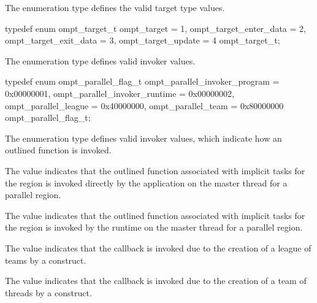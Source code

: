 \label{sec:ompt_target_t}

\summary
The  enumeration type defines the valid target type values.

\format
\begin{ccppspecific}
\begin{omptEnum}
typedef enum ompt_target_t {
  ompt_target                         = 1,
  ompt_target_enter_data              = 2,
  ompt_target_exit_data               = 3,
  ompt_target_update                  = 4
} ompt_target_t;
\end{omptEnum}
\end{ccppspecific}



\label{sec:ompt_parallel_flag_t}

\summary
The  enumeration type defines valid invoker values.

\format
\begin{ccppspecific}
\begin{omptEnum}
typedef enum ompt_parallel_flag_t {
  ompt_parallel_invoker_program = 0x00000001,
  ompt_parallel_invoker_runtime = 0x00000002,
  ompt_parallel_league          = 0x40000000,
  ompt_parallel_team            = 0x80000000
} ompt_parallel_flag_t;
\end{omptEnum}
\end{ccppspecific}

\descr
The  enumeration type defines valid invoker values,
which indicate how an outlined function is invoked. 

The value  indicates that the outlined 
function associated with implicit tasks for the region is invoked directly 
by the application on the master thread for a parallel region.

The value  indicates that the outlined 
function associated with implicit tasks for the region is invoked by the 
runtime on the master thread for a parallel region.

The value  indicates that the callback is invoked
due to the creation of a league of teams by a  construct.

The value  indicates that the callback is invoked
due to the creation of a team of threads by a  construct.



